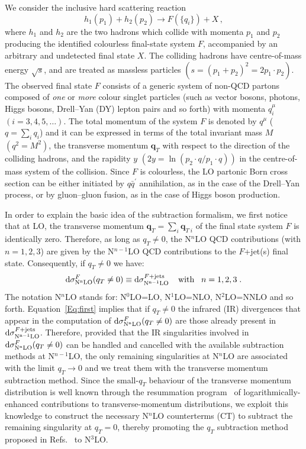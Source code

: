 \documentclass[12pt]{article}
\def\to{\rightarrow}
\DeclareRobustCommand{\qt}{q_T}
\DeclareRobustCommand{\bqt}{\ensuremath{\mathbf{q}_T}}
\DeclareRobustCommand{\rd}{\ensuremath{\mathrm{d}}}
\begin{document}
We consider the inclusive hard scattering reaction 
\begin{equation}
h_1(p_1)+h_2(p_2)\to F(\{q_i\})+X\, ,
\label{class}
\end{equation}
where $h_1$ and $h_2$ are the two hadrons which collide with momenta $p_1$ and $p_2$ producing the identified colourless final-state system $F$, accompanied by an arbitrary and undetected final state $X$. The colliding hadrons have centre-of-mass energy $\sqrt s$, and are treated as massless particles $(s= (p_1+p_2)^2 = 2p_1\cdot p_2)$. The observed final state $F$ consists of a generic system of non-QCD partons composed of {\em one} or {\em more} colour singlet particles (such as vector bosons, photons, Higgs bosons, Drell--Yan (DY) lepton pairs and so forth) with momenta $q_i^{\mu}$ $(i=3,4,5,\dots)$. The total momentum of the system $F$ is denoted by $q^{\mu}$ ($q=\sum_i q_i$) and it can be expressed in terms of the total invariant mass $M$ $(q^2=M^2)$, the transverse momentum $\bqt$ with respect to the direction of the colliding hadrons, and the rapidity $y$ $(2y = \ln (p_2\cdot q/p_1\cdot q))$ in the centre-of-mass system of the collision. 
Since $F$ is colourless, the LO partonic Born cross section can be either initiated by $q\bar{q}^{\prime}$ annihilation, as in the case of the Drell--Yan process, or by gluon--gluon fusion, as in the case of Higgs boson production.

In order to explain the basic idea  of the subtraction formalism, we first notice that at LO, the transverse momentum $\mathbf{q}_{T}=\sum_i \mathbf{q}_{T\;i}$ of the final state system $F$ is identically zero. Therefore, as long as $\qt \neq 0$, the N$^{n}$LO QCD contributions (with $n=1,2,3$) are given by the N$^{n-1}$LO QCD contributions to the $F$+jet(s) final state. Consequently, if $\qt \neq 0$ we have:
\begin{equation}
\label{Eq:first}
\rd\sigma^{F}_{\rm N^{n}LO}(\qt \neq0) \equiv \rd\sigma^{F+{\rm jets}}_{\rm N^{n-1}LO}\;\;\;\;{\rm with}\;\;\; n=1,2,3\;.
\end{equation}
The notation N$^{n}$LO stands for: N$^{0}$LO=LO, N$^{1}$LO=NLO, N$^{2}$LO=NNLO and so forth. Equation~\eqref{Eq:first} implies that if $\qt \neq 0$ the infrared (IR) divergences that appear in the computation of $\rd\sigma^{F}_{\rm N^{n}LO}(\qt \neq0)$ are those already present in $\rd\sigma^{F+{\rm jets}}_{\rm N^{n-1}LO}$.
Therefore, provided that the IR singularities involved in $\rd\sigma^{F}_{\rm N^{n}LO}(\qt \neq0)$ can be handled and cancelled with the available subtraction methods at N$^{n-1}$LO, the only remaining singularities at  N$^{n}$LO are associated with the limit $\qt \rightarrow 0$ and we treat them with the transverse momentum subtraction method. Since the small-$\qt$ behaviour of the transverse momentum distribution is well known through the resummation program~\cite{qTRes:program} of logarithmically-enhanced contributions to transverse-momentum distributions, we exploit this knowledge to construct the necessary N$^{n}$LO counterterms (CT) to subtract the remaining singularity at $\qt=0$, thereby promoting the $\qt$ subtraction method proposed in Refs.~\cite{Catani:2007vq} to N$^{3}$LO. 
\end{document}
